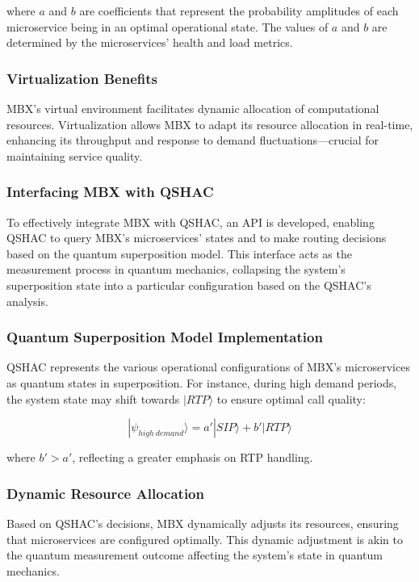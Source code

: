 \documentclass[12pt]{article}
\begin{document}
where \(a\) and \(b\) are coefficients that represent the probability amplitudes of each microservice being in an optimal operational state. The values of \(a\) and \(b\) are determined by the microservices' health and load metrics.

\subsubsection{Virtualization Benefits}

MBX's virtual environment facilitates dynamic allocation of computational resources. Virtualization allows MBX to adapt its resource allocation in real-time, enhancing its throughput and response to demand fluctuations—crucial for maintaining service quality.

\subsubsection{Interfacing MBX with QSHAC}

To effectively integrate MBX with QSHAC, an API is developed, enabling QSHAC to query MBX's microservices' states and to make routing decisions based on the quantum superposition model. This interface acts as the measurement process in quantum mechanics, collapsing the system's superposition state into a particular configuration based on the QSHAC's analysis.

\subsubsection{Quantum Superposition Model Implementation}

QSHAC represents the various operational configurations of MBX's microservices as quantum states in superposition. For instance, during high demand periods, the system state may shift towards \(|RTP\rangle\) to ensure optimal call quality:

\[|\psi_{high\ demand}\rangle = a'|SIP\rangle + b'|RTP\rangle\]

where \(b' > a'\), reflecting a greater emphasis on RTP handling.

\subsubsection{Dynamic Resource Allocation}

Based on QSHAC's decisions, MBX dynamically adjusts its resources, ensuring that microservices are configured optimally. This dynamic adjustment is akin to the quantum measurement outcome affecting the system's state in quantum mechanics.
\end{document}
